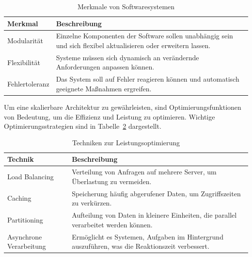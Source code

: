 \begin{table}[H]
    \centering
    \caption{Merkmale von Softwaresystemen \cite{studysmarter2024skalierbare}}
    \label{tab:merkmale}
    \begin{tabular}{p{4cm} p{10cm}}
        \textbf{Merkmal} & \textbf{Beschreibung} \\ \hline
 
        Modularität &
        Einzelne Komponenten der Software sollen unabhängig sein und sich flexibel
        aktualisieren oder erweitern lassen. \\ \hline
 
        Flexibilität &
        Systeme müssen sich dynamisch an verändernde Anforderungen anpassen können.
        \\ \hline
 
        Fehlertoleranz &
        Das System soll auf Fehler reagieren können und automatisch geeignete
        Maßnahmen ergreifen. \\ \hline
    \end{tabular}
\end{table}
 
Um eine skalierbare Architektur zu gewährleisten, sind Optimierungsfunktionen von
Bedeutung, um die Effizienz und Leistung zu optimieren.
Wichtige Optimierungsstrategien sind in Tabelle~\ref{tab:optimierung} dargestellt.
 
\begin{table}[H]
    \centering
    \caption{Techniken zur Leistungsoptimierung \cite{studysmarter2024skalierbare}}
    \label{tab:optimierung}
    \begin{tabular}{p{4cm} p{10cm}}
        \textbf{Technik} & \textbf{Beschreibung} \\ \hline
 
        Load Balancing &
        Verteilung von Anfragen auf mehrere Server, um Überlastung zu vermeiden.
        \\ \hline
 
        Caching &
        Speicherung häufig abgerufener Daten, um Zugriffszeiten zu verkürzen.
        \\ \hline
 
        Partitioning &
        Aufteilung von Daten in kleinere Einheiten, die parallel verarbeitet werden
        können. \\ \hline
 
        Asynchrone Verarbeitung &
        Ermöglicht es Systemen, Aufgaben im Hintergrund auszuführen, was die
        Reaktionszeit verbessert. \\ \hline
    \end{tabular}
\end{table}
 
